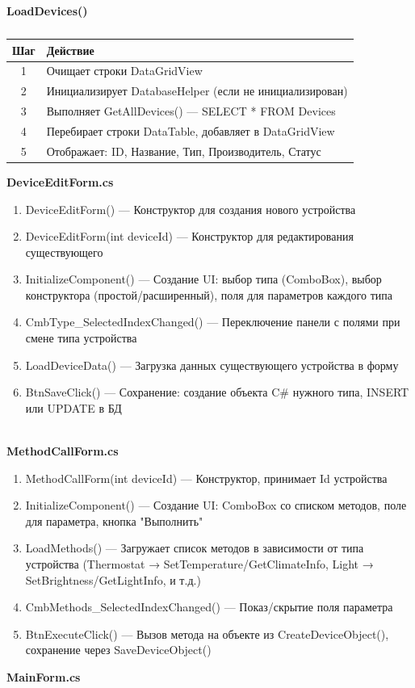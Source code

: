 \documentclass[oneside,a4paper,14pt]{extarticle}
\begin{document}
\textbf{LoadDevices()}
\begin{table}[h!]
\centering
\begin{tabular}{|c|l|}
\hline
\textbf{Шаг} & \textbf{Действие} \\
\hline
1 & Очищает строки DataGridView \\
\hline
2 & Инициализирует DatabaseHelper (если не инициализирован) \\
\hline
3 & Выполняет GetAllDevices() — SELECT * FROM Devices \\
\hline
4 & Перебирает строки DataTable, добавляет в DataGridView \\
\hline
5 & Отображает: ID, Название, Тип, Производитель, Статус \\
\hline
\end{tabular}
\caption*{}
\end{table}


\newpage
\textbf{DeviceEditForm.cs}\\
\begin{enumerate}
\item DeviceEditForm() — Конструктор для создания нового устройства\\
\item DeviceEditForm(int deviceId) — Конструктор для редактирования существующего
\item InitializeComponent() — Создание UI: выбор типа (ComboBox), выбор конструктора (простой/расширенный), поля для параметров каждого типа
\item CmbType\_SelectedIndexChanged() — Переключение панели с полями при смене типа устройства
\item LoadDeviceData() — Загрузка данных существующего устройства в форму
\item BtnSaveClick() — Сохранение: создание объекта C# нужного типа, INSERT или UPDATE в БД
\end{enumerate}\\

\textbf{MethodCallForm.cs}\\
\begin{enumerate}
\item MethodCallForm(int deviceId) — Конструктор, принимает Id устройства
\item InitializeComponent() — Создание UI: ComboBox со списком методов, поле для параметра, кнопка "Выполнить"
\item LoadMethods() — Загружает список методов в зависимости от типа устройства (Thermostat → SetTemperature/GetClimateInfo, Light → SetBrightness/GetLightInfo, и т.д.)
\item CmbMethods\_SelectedIndexChanged() — Показ/скрытие поля параметра
\item BtnExecuteClick() — Вызов метода на объекте из CreateDeviceObject(), сохранение через SaveDeviceObject()
\end{enumerate}
\newpage
\textbf{MainForm.cs}\\
\end{document}
